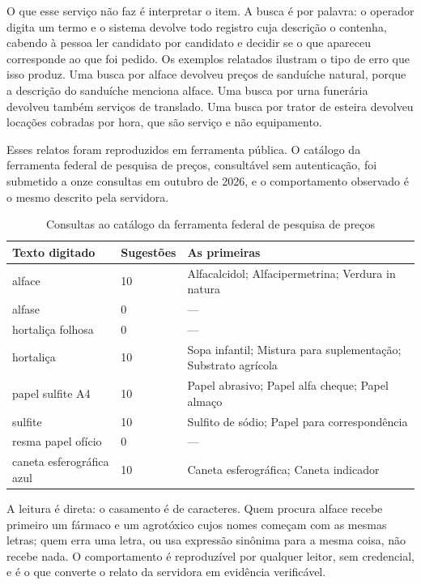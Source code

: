 O que esse serviço não faz é interpretar o item. A busca é por palavra: o
operador digita um termo e o sistema devolve todo registro cuja descrição o
contenha, cabendo à pessoa ler candidato por candidato e decidir se o que
apareceu corresponde ao que foi pedido. Os exemplos relatados ilustram o tipo de
erro que isso produz. Uma busca por alface devolveu preços de sanduíche natural,
porque a descrição do sanduíche menciona alface. Uma busca por urna funerária
devolveu também serviços de translado. Uma busca por trator de esteira devolveu
locações cobradas por hora, que são serviço e não equipamento.

Esses relatos foram reproduzidos em ferramenta pública. O catálogo da
ferramenta federal de pesquisa de preços, consultável sem autenticação, foi
submetido a onze consultas em outubro de 2026, e o comportamento observado é o
mesmo descrito pela servidora.

\begin{table}[H]
  \centering
  \caption{Consultas ao catálogo da ferramenta federal de pesquisa de preços}
  \label{tab:consultas-catalogo}
  \begin{ufopaespacosimples}
  \small
  \begin{tabularx}{\textwidth}{@{}llX@{}}
    \toprule
    \textbf{Texto digitado} & \textbf{Sugestões} & \textbf{As primeiras} \\
    \midrule
    alface & 10 & Alfacalcidol; Alfacipermetrina; Verdura in natura \\
    alfase & 0 & --- \\
    hortaliça folhosa & 0 & --- \\
    hortaliça & 10 & Sopa infantil; Mistura para suplementação; Substrato
      agrícola \\
    papel sulfite A4 & 10 & Papel abrasivo; Papel alfa cheque; Papel almaço \\
    sulfite & 10 & Sulfito de sódio; Papel para correspondência \\
    resma papel ofício & 0 & --- \\
    caneta esferográfica azul & 10 & Caneta esferográfica; Caneta indicador \\
    \bottomrule
  \end{tabularx}
  \end{ufopaespacosimples}
\end{table}

A leitura é direta: o casamento é de caracteres. Quem procura alface recebe
primeiro um fármaco e um agrotóxico cujos nomes começam com as mesmas letras;
quem erra uma letra, ou usa expressão sinônima para a mesma coisa, não recebe
nada. O comportamento é reproduzível por qualquer leitor, sem credencial, e é o
que converte o relato da servidora em evidência verificável.

